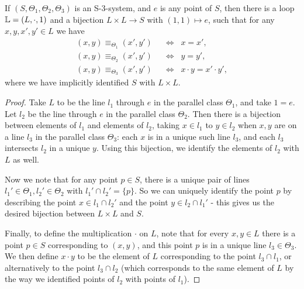 \documentclass[letterpaper,11pt]{article}
\begin{document}
\begin{lem}\label{S3-coords} If $(S,\Theta_1,\Theta_2,\Theta_3)$ is an S-3-system, and $e$ is any point of $S$, then there is a loop $\mathbb{L} = (L,\cdot,1)$ and a bijection $L\times L \rightarrow S$ with $(1,1) \mapsto e$, such that for any $x,y,x',y' \in L$ we have
\begin{align*}
(x,y) \equiv_{\Theta_1} (x',y') \;\; &\iff \;\; x = x',\\
(x,y) \equiv_{\Theta_2} (x',y') \;\; &\iff \;\; y = y',\\
(x,y) \equiv_{\Theta_3} (x',y') \;\; &\iff \;\; x\cdot y = x'\cdot y',
\end{align*}
where we have implicitly identified $S$ with $L\times L$.
\end{lem}
\begin{proof} Take $L$ to be the line $l_1$ through $e$ in the parallel class $\Theta_1$, and take $1 = e$. Let $l_2$ be the line through $e$ in the parallel class $\Theta_2$. Then there is a bijection between elements of $l_1$ and elements of $l_2$, taking $x \in l_1$ to $y \in l_2$ when $x,y$ are on a line $l_3$ in the parallel class $\Theta_3$: each $x$ is in a unique such line $l_3$, and each $l_3$ intersects $l_2$ in a unique $y$. Using this bijection, we identify the elements of $l_2$ with $L$ as well.

Now we note that for any point $p \in S$, there is a unique pair of lines $l_1' \in \Theta_1, l_2' \in \Theta_2$ with $l_1' \cap l_2' = \{p\}$. So we can uniquely identify the point $p$ by describing the point $x \in l_1 \cap l_2'$ and the point $y \in l_2 \cap l_1'$ - this gives us the desired bijection between $L\times L$ and $S$.

\begin{center}
\end{center}

Finally, to define the multiplication $\cdot$ on $L$, note that for every $x,y \in L$ there is a point $p \in S$ corresponding to $(x,y)$, and this point $p$ is in a unique line $l_3 \in \Theta_3$. We then define $x\cdot y$ to be the element of $L$ corresponding to the point $l_3 \cap l_1$, or alternatively to the point $l_3 \cap l_2$ (which corresponds to the same element of $L$ by the way we identified points of $l_2$ with points of $l_1$).
\end{proof}
\end{document}
